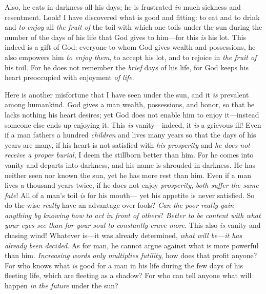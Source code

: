 \begin{biblechapter}
\verse Also, he eats in darkness all his days; he is frustrated \textit{in} much sickness and resentment.
 Look! I have discovered what is good and fitting: to eat and to drink and \textit{to enjoy} all \textit{the fruit of} the toil with which one toils under the sun during the number of the days of his life that God gives to him—for this \textit{is} his lot.
\verse This indeed is a gift of God: everyone to whom God gives wealth and possessions, he also empowers him \textit{to enjoy them}, to accept his lot, and to rejoice in \textit{the fruit of} his toil.
\verse For he does not remember the \textit{brief} days of his life, for God keeps his heart preoccupied with enjoyment \textit{of life}.
\end{biblechapter}

\begin{biblechapter} %
 Here is another misfortune that I have seen under the sun, and it \textit{is} prevalent among humankind.
\verse God gives a man wealth, possessions, and honor, so that he lacks nothing his heart desires; yet God does not enable him to enjoy it—instead someone else ends up enjoying it. This \textit{is} vanity—indeed, it \textit{is} a grievous ill!
\verse Even if a man fathers a hundred \textit{children} and lives many years so that the days of his years are many, if his heart is not satisfied with \textit{his prosperity} and \textit{he does not receive a proper burial}, I deem the stillborn better than him.
\verse For he comes into vanity and departs into darkness, and his name is shrouded in darkness.
\verse He has neither seen nor known the sun, yet he has more rest than him.
\verse Even if a man lives a thousand years twice, if he does not enjoy \textit{prosperity}, \textit{both suffer the same fate}!
 All of a man’s toil \textit{is} for his mouth— 
yet his appetite is never satisfied.
\verse So do the wise \textit{really} have an advantage over fools? 
\textit{Can the poor \textit{really} gain anything by knowing how to act in front of others}?
\verse \textit{Better to be content with what your eyes see 
than for your soul to constantly crave more}. 
This also \textit{is} vanity and chasing wind!
 Whatever is—it was already determined, 
\textit{what will be—it has already been decided}. 
As for man, he cannot argue 
against what is more powerful than him.
\verse \textit{Increasing words only multiplies futility}, 
how does that profit anyone?
 For who knows what \textit{is} good for a man in his life during the few days of his fleeting life, which are fleeting as a shadow? For who can tell anyone what will happen \textit{in the future} under the sun?
\end{biblechapter}

